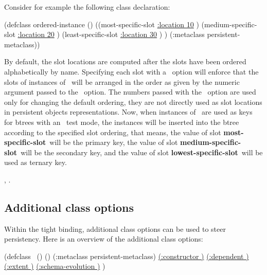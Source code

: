 Consider for example the following class declaration:
\begin{CompactCode}
\listener{}(defclass ordered-instance ()
              ((most-specific-slot \underline{:location 10}
                                   )
               (medium-specific-slot \underline{:location 20}
                                     )
               (least-specific-slot \underline{:location 30}
                                    )
               )
              (:metaclass persistent-metaclass))
\end{CompactCode}

By default, the slot locations are computed after the slots have been
ordered alphabetically by name.  Specifying each slot with a
\ option will enforce that the slots of instances of
\ will be arranged in the order as given by
the numeric argument passed to the \ option.  The
numbers passed with the \ option are used only for
changing the default ordering, they are not directly used as slot
locations in persistent objects representations.  Now, when instances
of \ are used as keys for btrees with an
\ test mode, the instances will be inserted into the btree
according to the specified slot ordering, that means, the value of
slot \textbf{most-specific-slot}\ will be the primary key, the value
of slot \textbf{medium-specific-slot}\ will be the secondary key, and
the value of slot \textbf{lowest-specific-slot}\ will be used as
ternary key.

 ,
.

\subsection{Additional class options}%
\label{sec:AdditionalClassOptions}

Within the tight binding, additional class options  can
  be used to steer persistency. Here is an overview of the additional
  class options:

\begin{IndentedCompactCode}
(defclass \ ()
  ()
  (:metaclass persistent-metaclass)
  \underline{(:constructor )}  
  \underline{(:dependent )}
  \underline{(:extent )}
  \underline{(:schema-evolution )}
  )
\end{IndentedCompactCode}

